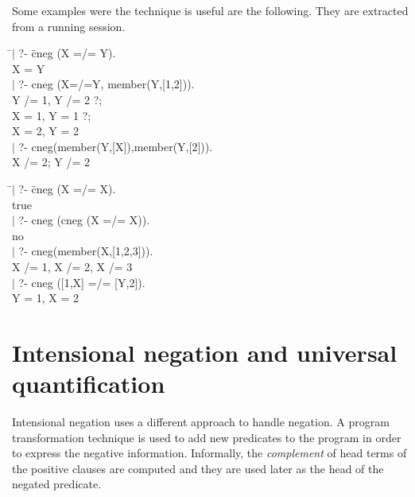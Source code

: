 \documentclass[]{llncs}
\newenvironment{mytabbing}
   {\vspace{0.3em}\begin{small}\begin{tabbing}}
   {\end{tabbing}\end{small}\vspace{0.3em}}
\begin{document}
Some examples were the technique is useful are the following.
They are extracted from a running session.

\begin{small}
\begin{tt}
\hspace{-0.5cm}
\begin{minipage}[h]{7.8cm}
\begin{mytabbing}
\=$|$ ?- \= cneg (X =/= Y). \\
    \>       \> X = Y \\
    \>$|$ ?- \> cneg (X=/=Y, member(Y,[1,2])). \\
    \>       \> Y /= 1, Y /= 2 ?;\\
    \>       \> X = 1, Y = 1 ?; \\
    \>       \> X = 2, Y = 2  \\
    \>$|$ ?- \> cneg(member(Y,[X]),member(Y,[2])). \\
    \>       \> X /= 2; Y /= 2
\end{mytabbing}
\end{minipage}
\begin{minipage}[h]{7.8cm}
\begin{mytabbing}
\=$|$ ?- \= cneg (X =/= X). \\
    \>       \> true\\
    \>$|$ ?- \> cneg (cneg (X =/= X)). \\
    \>       \> no \\
    \>$|$ ?- \> cneg(member(X,[1,2,3])). \\
    \>       \> X /= 1, X /= 2, X /= 3 \\
    \>$|$ ?- \> cneg ([1,X] =/= [Y,2]). \\
    \>       \> Y = 1, X = 2
\end{mytabbing}
\end{minipage}
\end{tt}
\end{small}


\vspace{-7pt}
\section{Intensional negation and universal quantification}
\vspace{-7pt}

Intensional negation \cite{Barbuti1,Barbuti2}
uses a different approach to handle negation.
A program transformation technique is used to add new predicates
to the program in order to express the negative information.
Informally, the {\em complement} of head terms of the positive
clauses are computed and they are used later as the head of the
negated predicate.
\end{document}
